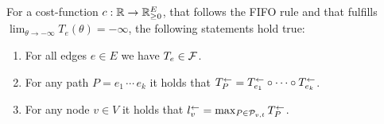 \begin{corollary}
    For a cost-function $c:\mathbb{R}\rightarrow\mathbb{R}_{\geq0}^E$, that follows the FIFO rule and that fulfills $\lim_{\theta\to-\infty} T_e(\theta) = -\infty$, the following statements hold true:
    \begin{enumerate}[label=(\roman*)]
        \item For all edges $e\in E$ we have $T_e \in \mathcal{F}$.
        \item\label{prop:reversal-props:paths} For any path $P=e_1\,\cdots \,e_k$ it holds that $T_P^{\leftarrow} = T_{e_1}^{\leftarrow} \circ \cdots \circ T_{e_k}^{\leftarrow}$.
        \item For any node $v\in V$ it holds that $l_v^{\leftarrow} = \max_{P\in\mathcal{P}_{v,t}} T_P^{\leftarrow}$.
    \end{enumerate}
\end{corollary}

